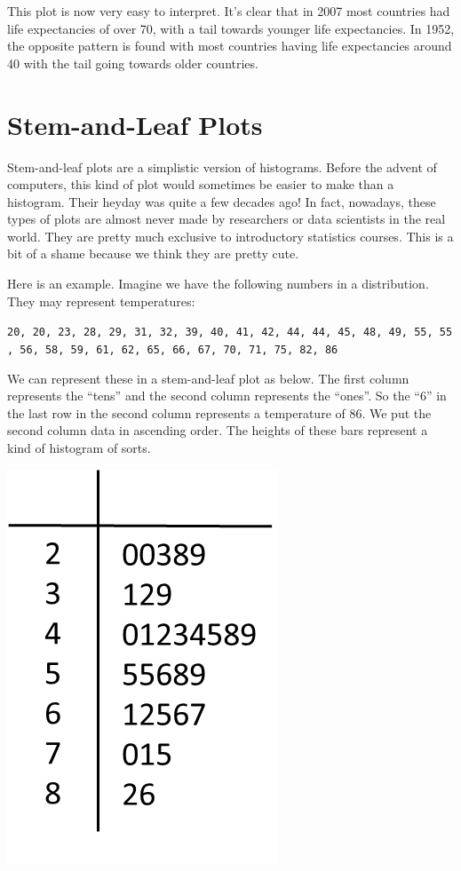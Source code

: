 \documentclass[
  letterpaper,
  DIV=11,
  numbers=noendperiod]{scrreprt}
\begin{document}
This plot is now very easy to interpret. It's clear that in 2007 most
countries had life expectancies of over 70, with a tail towards younger
life expectancies. In 1952, the opposite pattern is found with most
countries having life expectancies around 40 with the tail going towards
older countries.

\hypertarget{stem-and-leaf-plots}{%
\section{Stem-and-Leaf Plots}\label{stem-and-leaf-plots}}

Stem-and-leaf plots are a simplistic version of histograms. Before the
advent of computers, this kind of plot would sometimes be easier to make
than a histogram. Their heyday was quite a few decades ago! In fact,
nowadays, these types of plots are almost never made by researchers or
data scientists in the real world. They are pretty much exclusive to
introductory statistics courses. This is a bit of a shame because we
think they are pretty cute.

Here is an example. Imagine we have the following numbers in a
distribution. They may represent temperatures:

\texttt{20,\ 20,\ 23,\ 28,\ 29,\ 31,\ 32,\ 39,\ 40,\ 41,\ 42,\ 44,\ 44,\ 45,\ 48,\ 49,\ 55,\ 55,\ 56,\ 58,\ 59,\ 61,\ 62,\ 65,\ 66,\ 67,\ 70,\ 71,\ 75,\ 82,\ 86}

We can represent these in a stem-and-leaf plot as below. The first
column represents the ``tens'' and the second column represents the
``ones''. So the ``6'' in the last row in the second column represents a
temperature of 86. We put the second column data in ascending order. The
heights of these bars represent a kind of histogram of sorts.

\includegraphics{./img/sl1.png}
\end{document}
